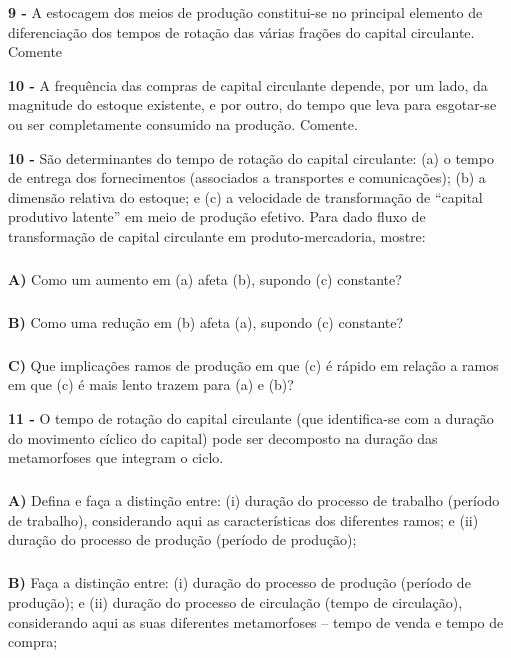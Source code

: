 \documentclass[a4paper, 12pt]{article} %
\begin{document}
\vspace{0.5cm}

\par \textbf{9 -} A estocagem dos meios de produção constitui-se no principal elemento de diferenciação dos tempos
de rotação das várias frações do capital circulante. Comente

\vspace{0.5cm}

\par \textbf{10 -} A frequência das compras de capital circulante depende, por um lado, da magnitude do estoque
existente, e por outro, do tempo que leva para esgotar-se ou ser completamente consumido na
produção. Comente.

\vspace{0.5cm}

\par \textbf{10 -} São determinantes do tempo de rotação do capital circulante: (a) o tempo de entrega dos
fornecimentos (associados a transportes e comunicações); (b) a dimensão relativa do estoque; e (c) a
velocidade de transformação de “capital produtivo latente” em meio de produção efetivo. Para dado
fluxo de transformação de capital circulante em produto-mercadoria, mostre:

\subparagraph{} \textbf{A)} Como um aumento em (a) afeta (b), supondo (c) constante?

\subparagraph{} \textbf{B)} Como uma redução em (b) afeta (a), supondo (c) constante?

\subparagraph{} \textbf{C)} Que implicações ramos de produção em que (c) é rápido em relação a ramos em que (c) é mais
lento trazem para (a) e (b)? 

\vspace{0.5cm}

\par \textbf{11 -} O tempo de rotação do capital circulante (que identifica-se com a duração do movimento cíclico do
capital) pode ser decomposto na duração das metamorfoses que integram o ciclo.

\subparagraph{} \textbf{A)} Defina e faça a distinção entre: (i) duração do processo de trabalho (período de trabalho),
considerando aqui as características dos diferentes ramos; e (ii) duração do processo de
produção (período de produção);

\subparagraph{} \textbf{B)} Faça a distinção entre: (i) duração do processo de produção (período de produção); e (ii)
duração do processo de circulação (tempo de circulação), considerando aqui as suas diferentes
metamorfoses – tempo de venda e tempo de compra;
\end{document}
